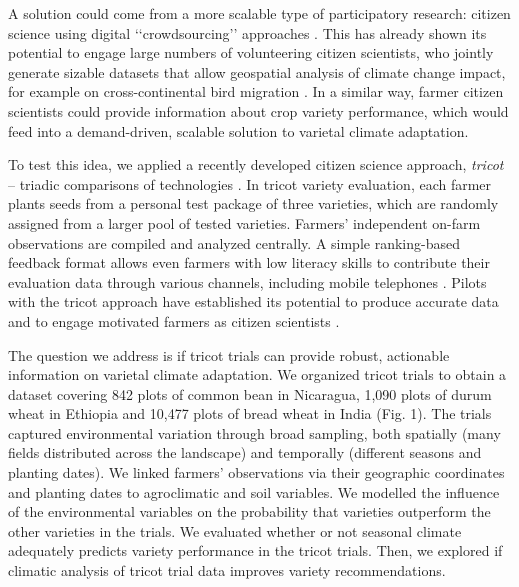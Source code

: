 \documentclass[9pt,twocolumn,twoside]{pnas-new}
\begin{document}
A solution could come from a more scalable type of participatory research: citizen science using digital ‘‘crowdsourcing’’ approaches \cite{bonney2009citizen,minet2017crowdsourcing,ryan2018role}. This has already shown its potential to engage large numbers of volunteering citizen scientists, who jointly generate sizable datasets that allow geospatial analysis of climate change impact, for example on cross-continental bird migration \cite{cooper2014invisible}. In a similar way, farmer citizen scientists could provide information about crop variety performance, which would feed into a demand-driven, scalable solution to varietal climate adaptation.

To test this idea, we applied a recently developed citizen science approach, \textit{tricot} -- triadic comparisons of technologies \cite{van2011crowdsourcing,van2016first}. In tricot variety evaluation, each farmer plants seeds from a personal test package of three varieties, which are randomly assigned from a larger pool of tested varieties. Farmers' independent on-farm observations are compiled and analyzed centrally. A simple ranking-based feedback format allows even farmers with low literacy skills to contribute their evaluation data through various channels, including mobile telephones \cite{van2016first}. Pilots with the tricot approach have established its potential to produce accurate data \cite{steinke2017accuracy} and to engage motivated farmers as citizen scientists \cite{beza2017prospects}. 

The question we address is if tricot trials can provide robust, actionable information on varietal climate adaptation. We organized tricot trials to obtain a dataset covering 842 plots of common bean in Nicaragua, 1,090 plots of durum wheat in Ethiopia and 10,477 plots of bread wheat in India (Fig. 1). The trials captured environmental variation through broad sampling, both spatially (many fields distributed across the landscape) and temporally (different seasons and planting dates). We linked farmers' observations via their geographic coordinates and planting dates to agroclimatic and soil variables. We modelled the influence of the environmental variables on the probability that varieties outperform the other varieties in the trials. We evaluated whether or not seasonal climate adequately predicts variety performance in the tricot trials. Then, we explored if climatic analysis of tricot trial data improves variety recommendations.
\end{document}
